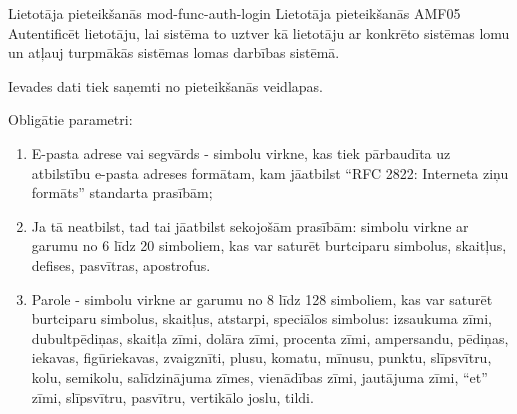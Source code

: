 \moduleFunctionTable
{Lietotāja pieteikšanās}
{mod-func-auth-login}
{Lietotāja pieteikšanās}
{AMF05}
{
	Autentificēt lietotāju, lai sistēma to uztver kā lietotāju ar konkrēto sistēmas lomu un atļauj turpmākās sistēmas lomas darbības sistēmā.
}
{
	Ievades dati tiek saņemti no pieteikšanās veidlapas.

	Obligātie parametri:
	\begin{enumerate}
		\item E-pasta adrese vai segvārds - simbolu virkne, kas tiek pārbaudīta uz atbilstību e-pasta adreses formātam, kam jāatbilst ``RFC 2822: Interneta ziņu formāts'' standarta prasībām;
		\item Ja tā neatbilst, tad tai jāatbilst sekojošām prasībām: simbolu virkne ar garumu no 6 līdz 20 simboliem, kas var saturēt burtciparu simbolus, skaitļus, defises, pasvītras, apostrofus.
		\item Parole - simbolu virkne ar garumu no 8 līdz 128 simboliem, kas var saturēt burtciparu simbolus, skaitļus, atstarpi, speciālos simbolus: izsaukuma zīmi, dubultpēdiņas, skaitļa zīmi, dolāra zīmi, procenta zīmi, ampersandu, pēdiņas, iekavas, figūriekavas, zvaigznīti, plusu, komatu, mīnusu, punktu, slīpsvītru, kolu, semikolu, salīdzinājuma zīmes, vienādības zīmi, jautājuma zīmi, ``et'' zīmi, slīpsvītru, pasvītru, vertikālo joslu, tildi.
	\end{enumerate}
}
